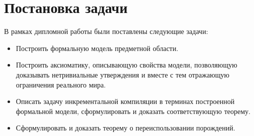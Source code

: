 \section{Постановка задачи}

В рамках дипломной работы были поставлены следующие задачи:

\begin{itemize}

	\item Построить формальную модель предметной области.

	\item Построить аксиоматику, описывающую свойства модели, позволяющую доказывать нетривиальные утверждения и вместе с тем отражающую ограничения реального мира.

	\item Описать задачу инкрементальной компиляции в терминах построенной формальной модели, сформулировать и доказать соответствующую теорему.

	\item Сформулировать и доказать теорему о переиспользовании порождений.

\end{itemize}